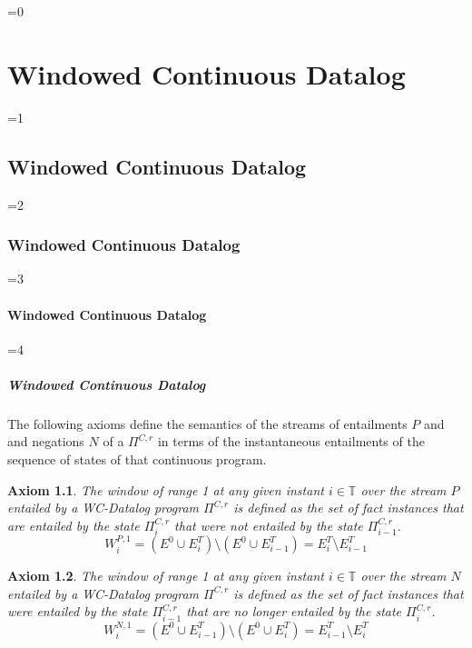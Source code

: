 \documentclass[twocolumn,preprint,3p,number]{elsarticle}
\theoremstyle{plain}
\newtheorem{axiom}{Axiom}
\theoremstyle{definition}
\newcounter{nestingdepth}
\newenvironment{nestedsection}[2]{
  \ifnum\value{nestingdepth}=0
    \chapter{#1}
  \else
    \ifnum\value{nestingdepth}=1
      \section{#1}
    \else
      \ifnum\value{nestingdepth}=2
        \subsection{#1}
      \else
        \ifnum\value{nestingdepth}=3
          \subsubsection{#1}
        \else
          \ifnum\value{nestingdepth}=4
            \paragraph{#1}
          \else
            \PackageError{nestedsections}{Maximum nesting level exceeded!}{uh oh!}
          \fi
        \fi
      \fi
    \fi
  \fi
  \addtocounter{nestingdepth}{1}
  \label{sec:#2}
}{\addtocounter{nestingdepth}{-1}}
\begin{document}
\begin{nestedsection}{Windowed Continuous Datalog}{semantics}
The following axioms define the semantics of the streams of
entailments $P$ and and negations $N$ of a $\Pi^{C,r}$ in terms of the
instantaneous entailments of the sequence of states of that continuous
program.

{\nobreak\begin{axiom}
\label{axiom:continuous datalog: positive window increment}
The window of range 1 at any given instant ${i \in \mathbb{T}}$ over
the stream $P$ entailed by a WC-Datalog program $\Pi^{C,r}$ is defined
as the set of fact instances that are entailed by the state
$\Pi^{C,r}_i$ that were not entailed by the state $\Pi^{C,r}_{i-1}$.
\begin{equation*}
W^{P,1}_{i} = \left( E^0 \cup E^T_{i} \right) \setminus
\left( E^0 \cup E^T_{i-1} \right) = E^T_{i} \setminus E^T_{i-1}
\end{equation*}
\end{axiom}}

{\nobreak\begin{axiom}
\label{axiom:continuous datalog: negative window increment}
The window of range 1 at any given instant ${i \in \mathbb{T}}$ over
the stream $N$ entailed by a WC-Datalog program $\Pi^{C,r}$ is defined
as the set of fact instances that were entailed by the state
$\Pi^{C,r}_{i-1}$ that are no longer entailed by the state
$\Pi^{C,r}_i$.
\begin{equation*}
W^{N,1}_{i} = \left( E^0 \cup E^T_{i-1} \right) \setminus
\left( E^0 \cup E^T_{i} \right) = E^T_{i-1} \setminus E^T_{i}
\end{equation*}
\end{axiom}}



\end{nestedsection}
\end{document}
